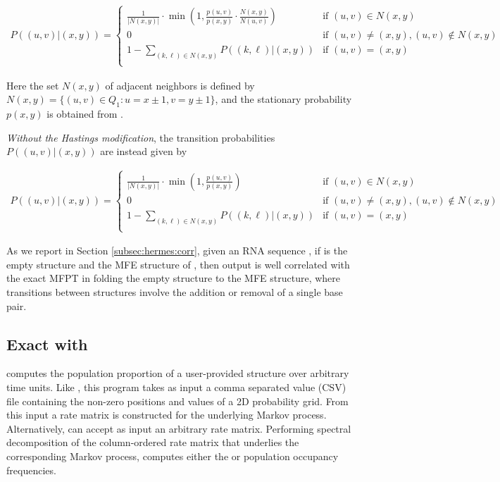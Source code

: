 \begin{align}
\label{eq:hermes:xitionProbFfttwoWithHastings}
P((u,v)|(x,y))=
\begin{cases}
\frac{1}{|N(x,y)|} \cdot \min\left(1, \frac{p(u,v)}{p(x,y)} \cdot
\frac{N(x,y)}{N(u,v)}\right) & \text{if $(u,v) \in N(x,y)$} \\
0 &\text{if $(u,v) \ne (x,y), (u,v) \not\in N(x,y)$} \\
1 - \sum_{(k,\ell) \in N(x,y)} P((k,\ell)|(x,y)) & \text{if $(u,v)=(x,y)$} \\
\end{cases}
\end{align}

Here the set $N(x,y)$ of adjacent neighbors is defined by $N(x,y) = \{
(u,v) \in Q_1 : u = x \pm 1, v = y \pm 1 \}$, and the stationary
probability $p(x,y)$ is obtained from \ffttwo.

{\em Without the Hastings modification}, the transition probabilities
$P((u,v)|(x,y))$ are instead given by

\begin{align}
\label{eq:hermes:xitionProbFfttwoWithoutHastings}
P((u,v)|(x,y))=
\begin{cases}
\frac{1}{|N(x,y)|} \cdot \min\left(1, \frac{p(u,v)}{p(x,y)}\right)
& \text{if $(u,v) \in N(x,y)$} \\
0 &\text{if $(u,v) \ne (x,y), (u,v) \not\in N(x,y)$} \\
1 - \sum_{(k,\ell) \in N(x,y)} P((k,\ell)|(x,y)) & \text{if $(u,v)=(x,y)$} \\
\end{cases}
\end{align}

As we report in Section \ref{subsec:hermes:corr},
given an RNA
sequence \seq, if \strA is the empty structure and \strB the MFE
structure of \seq, then \fftmfpt output is well correlated with the
exact MFPT in folding the empty structure to the MFE structure, where
transitions between structures involve the addition or removal of a
single base pair.

\subsection{Exact \eqt with \rnaeq}
\label{subsec:hermes:rnaeq}

\rnaeq computes the population proportion of a user-provided structure
over arbitrary time units. Like \rnamfpt, this program takes as input a
comma separated value (CSV) file containing the non-zero positions and
values of a 2D probability grid. From this input a rate matrix
is constructed for the underlying Markov process. Alternatively,
\rnaeq can accept as input an arbitrary rate matrix. Performing
spectral decomposition of the column-ordered rate matrix that
underlies the corresponding Markov process, \rnaeq computes either
the \eqt or population occupancy frequencies.

